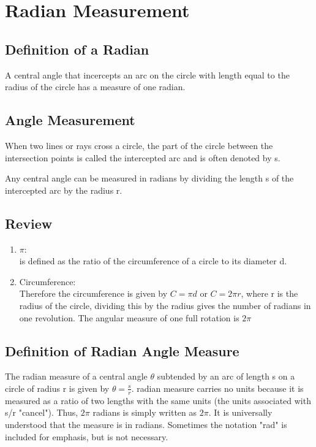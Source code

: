 \documentclass{article}
\begin{document}
\section{Radian Measurement}
\subsection{Definition of a Radian}
A central angle that incercepts an arc on the circle with length equal to the
radius of the circle has a measure of one radian.

\subsection{Angle Measurement}
When two lines or rays cross a circle, the part of the circle between the
intersection points is called the intercepted arc and is often denoted by s. 

Any central angle can be measured in radians by dividing the length s of the
intercepted arc by the radius r. 

\subsection{Review}
\begin{enumerate}
  \item $\pi$:\\
    is defined as the ratio of the circumference of a circle to its diameter
    d. 
  \item Circumference:\\
    Therefore the circumference is given by $C=\pi d$ or $C=2\pi r$, where r
    is the radius of the circle, dividing this by the radius gives the
    number of radians in one revolution. The angular measure of one full
    rotation is $2\pi$ 
\end{enumerate}

\subsection{Definition of Radian Angle Measure}
The radian measure of a central angle $\theta$ subtended by an arc of length s
on a circle of radius r is given by $\theta = \frac{s}{r}$.
radian measure carries no units because it is measured as a ratio of two lengths
with the same units (the units associated with s/r "cancel"). Thus, $2\pi$
radians is simply written as $2\pi$. It is universally understood that the
measure is in radians. Sometimes the notation "rad" is included for emphasis,
but is not necessary. 
\end{document}
